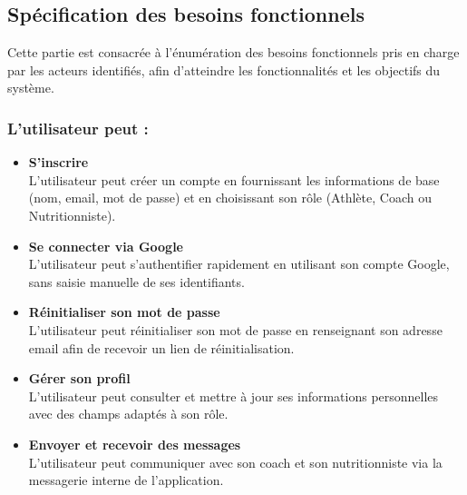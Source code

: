 \documentclass[a4paper,12pt]{report}
\begin{document}
\subsection{Spécification des besoins fonctionnels}

Cette partie est consacrée à l'énumération des besoins fonctionnels pris en charge par les 
acteurs identifiés, afin d'atteindre les fonctionnalités et les objectifs du système.

\subsubsection*{L'utilisateur peut :}
\begin{itemize}
    \item \textbf{S'inscrire} \\
    L'utilisateur peut créer un compte en fournissant les informations 
    de base (nom, email, mot de passe) et en choisissant son rôle (Athlète, Coach ou Nutritionniste).
    \item \textbf{Se connecter via Google} \\
    L'utilisateur  peut s'authentifier rapidement en 
    utilisant son compte Google, sans saisie manuelle de ses identifiants.
    \item \textbf{Réinitialiser son mot de passe} \\
    L'utilisateur peut réinitialiser son mot de 
    passe en renseignant son adresse email afin de recevoir un lien de réinitialisation.
     \item \textbf{Gérer son profil} \\
     L'utilisateur peut consulter et mettre à jour ses informations 
    personnelles avec des champs adaptés à son rôle.
    \item \textbf{Envoyer et recevoir des messages} \\
    L'utilisateur peut communiquer avec son coach 
    et son nutritionniste via la messagerie interne de l'application.
\end{itemize}
\end{document}
